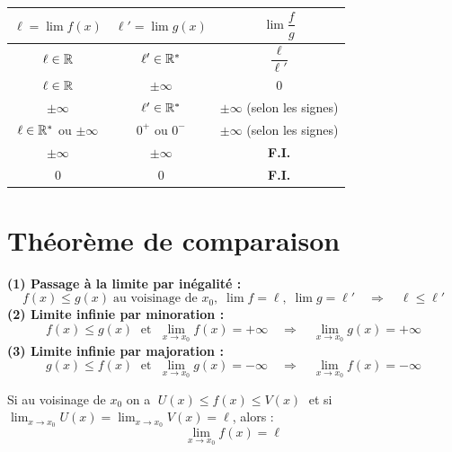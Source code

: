 \begin{theoreme}
  \bigskip
  \begin{center}
  \renewcommand{\arraystretch}{1.9}
  \begin{tabular}{|c|c|c|}
    \hline
    \textbf{\color{navy}$\ell = \lim f(x)$}
      & \textbf{\color{navy}$\ell' = \lim g(x)$}
      & \textbf{\color{navy}$\lim\dfrac{f}{g}$} \\
    \hline\hline
    $\ell \in \mathbb{R}$ & $\ell' \in \mathbb{R}^*$ & $\dfrac{\ell}{\ell'}$ \\
    \hline
    $\ell \in \mathbb{R}$ & $\pm\infty$ & $0$ \\
    \hline
    $\pm\infty$ & $\ell' \in \mathbb{R}^*$ & $\pm\infty$ (selon les signes) \\
    \hline
    $\ell \in \mathbb{R}^*$ ou $\pm\infty$ & $0^+$ ou $0^-$ & $\pm\infty$ (selon les signes) \\
    \hline
    $\pm\infty$ & $\pm\infty$ & \textbf{F.I.} \\
    \hline
    $0$ & $0$ & \textbf{F.I.} \\
    \hline
  \end{tabular}
  \end{center}
\end{theoreme}

\section{Th\'{e}or\`{e}me de comparaison}

\begin{theoreme}
  \textbf{(1) Passage \`{a} la limite par in\'{e}galit\'{e} :}
  \[
    f(x) \leq g(x) \;\text{au voisinage de } x_0,\;
    \lim f = \ell,\;\lim g = \ell'
    \quad\Longrightarrow\quad \ell \leq \ell'
  \]
  \textbf{(2) Limite infinie par minoration :}
  \[
    f(x) \leq g(x) \;\text{ et }\;
    \lim_{x \to x_0} f(x) = +\infty
    \quad\Longrightarrow\quad
    \lim_{x \to x_0} g(x) = +\infty
  \]
  \textbf{(3) Limite infinie par majoration :}
  \[
    g(x) \leq f(x) \;\text{ et }\;
    \lim_{x \to x_0} g(x) = -\infty
    \quad\Longrightarrow\quad
    \lim_{x \to x_0} f(x) = -\infty
  \]
\end{theoreme}

\begin{theoreme}
  Si au voisinage de $x_0$ on a $\;U(x) \leq f(x) \leq V(x)\;$
  et si $\displaystyle\lim_{x \to x_0} U(x) = \lim_{x \to x_0} V(x) = \ell$,
  alors :
  \[
    \lim_{x \to x_0} f(x) = \ell
  \]
\end{theoreme}

